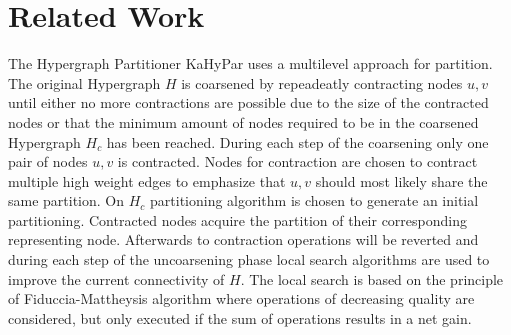 \documentclass[a4paper,12pt,bibtotoc,titlepage, liststotoc,BCOR7mm,headsepline,pointlessnumbers]{scrbook}
\numberwithin{equation}{section}
\begin{document}
\chapter{Related Work}
The Hypergraph Partitioner KaHyPar uses a multilevel approach for partition. The original Hypergraph $H$ is coarsened by repeadeatly contracting nodes $u,v$ until either no more contractions are possible due to the size of the contracted nodes or that the minimum amount of nodes required to be in the coarsened Hypergraph $H_c$ has been reached. During each step of the coarsening only one pair of nodes $u, v$ is contracted. Nodes for contraction are chosen to contract multiple high weight edges to emphasize that $u,v$ should most likely share the same partition. 
On $H_c$ partitioning algorithm is chosen to generate an initial partitioning. Contracted nodes acquire the partition of their corresponding representing node.  Afterwards to contraction operations will be reverted and 
during each step of the uncoarsening phase local search algorithms are used to improve the current connectivity of $H$. The local search is based on the principle of
Fiduccia-Mattheysis algorithm where operations of decreasing quality are considered, but only executed if the sum of operations results in a net gain.
\newline
\end{document}
